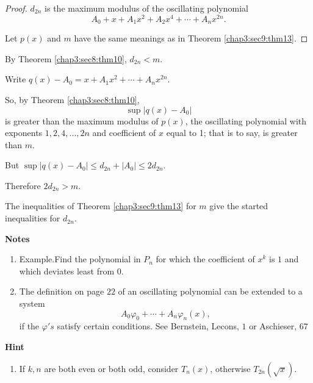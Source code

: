 \begin{proof}
  $d_{2n}$ is the maximum modulus of the oscillating polynomial
  $$
  A_ 0 +x+A_1 x^2 +A_2 x^4+ \cdots +A_n x^{2n}.
  $$

  Let $p(x)$ and $m$ have the same meanings as in
  Theorem \ref{chap3:sec9:thm13}. 
\end{proof}

By Theorem \ref{chap3:sec8:thm10}, \qquad $d_{2n}<m$.

Write $q(x)-A_0 =x+A_1 x^2 +\cdots + A_n x^{2n}$.

So, by Theorem \ref{chap3:sec8:thm10},
$$
\sup |q(x)-A_ 0|
$$
is greater than the maximum modulus of $p(x)$, the oscillating
polynomial with exponents $1,2,4, \ldots, 2n$ and coefficient of $x$
equal to 1; that is to say, is greater than $m$. 

But $\sup|q(x)-A_ 0| \leq d_{2n} +|A_ 0|\leq 2 d_{2n}$.

Therefore \qquad $2 d_{2n}>m$.

The inequalities of Theorem \ref{chap3:sec9:thm13} for $m$ give the
started inequalities for $d_{2n}$. 

\begin{center}
{\bf Notes}
\end{center}

\begin{enumerate}[1.]
\item Example.\pageoriginale Find the polynomial in $P_n$ for which the coefficient
  of $x^k$ is $1$ and which deviates least from $0$. 
\item The definition on page $22$ of an oscillating polynomial can be
  extended to a system 
  $$
  A_0 \varphi _0 + \cdots + A_n \varphi_n (x),
  $$
  if the $\varphi 's$ satisfy certain conditions. See Bernstein,
  Lecons, $1$ or Aschieser, $67$ 
\end{enumerate}

\begin{center}
{\bf Hint}
\end{center}

\begin{enumerate}[1.]
\item If $k,n$ are both even or both odd, consider $T_n(x)$, otherwise
  $T_{2n}(\sqrt{x})$. 
\end{enumerate}

